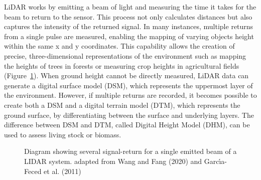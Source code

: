\documentclass[
  letterpaper,
  11pt,
  english,
  singlespacing,
  headsepline]{MastersDoctoralThesis}
\begin{document}
\begin{spacing}{1.5}
LiDAR works by emitting a beam of light and measuring the time it takes
for the beam to return to the sensor. This process not only calculates
distances but also captures the intensity of the returned signal. In
many instances, multiple returns from a single pulse are measured,
enabling the mapping of varying objects height within the same x and y
coordinates. This capability allows the creation of precise,
three-dimensional representations of the environment such as mapping the
heights of trees in forests or measuring crop heights in agricultural
fields (Figure~\ref{fig-LIDAR}). When ground height cannot be directly
measured, LiDAR data can generate a digital surface model (DSM), which
represents the uppermost layer of the environment. However, if multiple
returns are recorded, it becomes possible to create both a DSM and a
digital terrain model (DTM), which represents the ground surface, by
differentiating between the surface and underlying layers. The
difference between DSM and DTM, called Digital Height Model (DHM), can
be used to assess living stock or biomass.

\begin{figure}


\caption{\label{fig-LIDAR}Diagram showing several signal-return for a
single emitted beam of a LIDAR system. adapted from Wang and Fang (2020)
and Garcı́a-Feced et al. (2011)}

\end{figure}%


\end{spacing}
\end{document}

